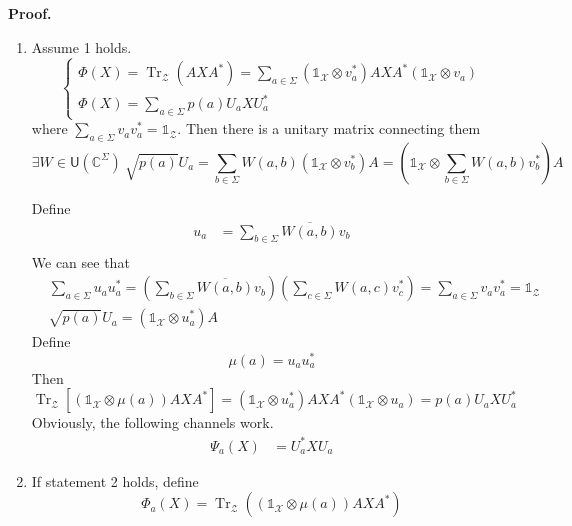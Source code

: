 \documentclass[aps,pra,onecolumn,notitlepage,superscriptaddress]{revtex4-1}
\newcommand{\C}{\mathbb{C}}
\newcommand{\spc}[1]{\mathcal{#1}}
\newcommand{\U}{\mathsf{U}}
\newcommand{\Tr}{\operatorname{Tr}}
\newcommand\I{\mathds{1}}
\def\Proof{{\bf Proof.~}}
\begin{document}
    \Proof {
        \begin{enumerate}
            \item Assume 1 holds. 
            \begin{equation}
                \begin{cases}
                    \Phi(X) = \Tr_{\spc Z}(AXA^*) = \sum_{a \in \Sigma} (\I_{\spc X} \otimes v_a^*) AXA^* (\I_{\spc X} \otimes v_a) \\
                    \Phi(X) = \sum_{a \in \Sigma} p(a) U_a X U_a^*
                \end{cases}
            \end{equation}
            where $\sum_{a \in \Sigma} v_av_a^* = \I_{\spc Z}$.
            Then there is a unitary matrix connecting them
            \begin{equation}
                \exists W \in \U(\C^\Sigma) \ \sqrt{p(a)}U_a = \sum_{b \in \Sigma} W(a,b) (\I_{\spc X} \otimes v_b ^*) A = \left( \I_{\spc X} \otimes \sum_{b \in \Sigma} W(a,b) v_b^* \right) A
            \end{equation}
    
            Define
            \begin{align*}
                u_a &= \sum_{b \in \Sigma} \overline{W(a,b)} v_b \\
            \end{align*}
            We can see that
            \begin{align*}
                &\sum_{a \in \Sigma} u_au_a^* =
                \left( \sum_{b \in \Sigma} \overline{W(a,b)} v_b  \right)
                \left( \sum_{c \in \Sigma} W(a,c) v_c^* \right)
                = \sum_{a \in \Sigma} v_av_a^* = \I_{\spc Z} \\
                &\sqrt{p(a)} U_a
                = (\I_{\spc X} \otimes u_a^*) A
            \end{align*}
            Define
            \begin{equation}
                \mu(a) = u_au_a^*
            \end{equation}
            Then
            \begin{equation}
                \Tr_{\spc Z} [ (\I_{\spc X} \otimes \mu(a)) AXA^* ] = (\I_{\spc X} \otimes u_a^*) AXA^* (\I_{\spc X} \otimes u_a) = p(a) U_a X U_a^*
            \end{equation}
            Obviously, the following channels work.
            \begin{align*}
                \Psi_a(X) &= U_a^*XU_a
            \end{align*}
            \item If statement 2 holds, define
            \begin{equation}
                \Phi_a(X) = \Tr_{\spc Z}((\I_{\spc X} \otimes \mu(a)) AXA^*)
            \end{equation}
    

\end{enumerate}}
\end{document}
